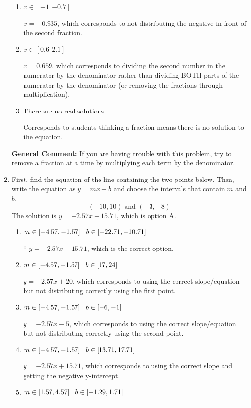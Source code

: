 \documentclass{extbook}[14pt]
\newcommand{\litem}[1]{\item #1

\rule{\textwidth}{0.4pt}}
\begin{document}
\begin{enumerate}
{\begin{enumerate}[label=\Alph*.]
* $x = -2.677$, which is the correct option.
\item \( x \in [-1, -0.7] \)

 $x = -0.935$, which corresponds to not distributing the negative in front of the second fraction.
\item \( x \in [0.6, 2.1] \)

 $x = 0.659$, which corresponds to dividing the second number in the numerator by the denominator rather than dividing BOTH parts of the numerator by the denominator (or removing the fractions through multiplication).
\item \( \text{There are no real solutions.} \)

Corresponds to students thinking a fraction means there is no solution to the equation.
\end{enumerate}

\textbf{General Comment:} If you are having trouble with this problem, try to remove a fraction at a time by multiplying each term by the denominator.
}
\litem{
First, find the equation of the line containing the two points below. Then, write the equation as $ y=mx+b $ and choose the intervals that contain $m$ and $b$.
\[ (-10, 10) \text{ and } (-3, -8) \]The solution is \( y = -2.57x -15.71 \), which is option A.\begin{enumerate}[label=\Alph*.]
\item \( m \in [-4.57, -1.57] \hspace*{3mm} b \in [-22.71, -10.71] \)

* $y = -2.57x -15.71$, which is the correct option.
\item \( m \in [-4.57, -1.57] \hspace*{3mm} b \in [17, 24] \)

 $y = -2.57x + 20$, which corresponds to using the correct slope/equation but not distributing correctly using the first point.
\item \( m \in [-4.57, -1.57] \hspace*{3mm} b \in [-6, -1] \)

 $y = -2.57x -5$, which corresponds to using the correct slope/equation but not distributing correctly using the second point.
\item \( m \in [-4.57, -1.57] \hspace*{3mm} b \in [13.71, 17.71] \)

 $y = -2.57x + 15.71$, which corresponds to using the correct slope and getting the negative y-intercept.
\item \( m \in [1.57, 4.57] \hspace*{3mm} b \in [-1.29, 1.71] \)


\end{enumerate}}
\end{enumerate}
\end{document}
